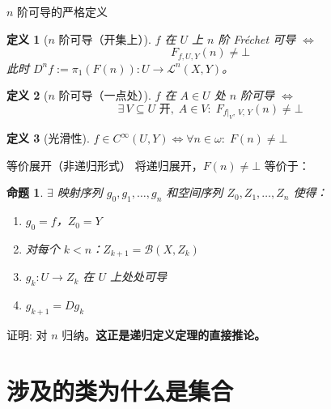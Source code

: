 \documentclass[10pt,aspectratio=169]{beamer}
\newtheorem{dfn}{定义}[section]
\newtheorem{prop}{命题}[section]
\newcommand{\calL}{\mathcal{L}}
\newcommand{\calB}{\mathcal{B}}
\begin{document}
\begin{frame}{$n$ 阶可导的严格定义}
  \begin{dfn}[$n$ 阶可导（开集上）]
    $f$ 在 $U$ 上 $n$ 阶 Fréchet 可导 $\iff$
    \[
      \boxed{F_{f,U,Y}(n) \neq \bot}
    \]
    此时 $D^n f := \pi_1(F(n)): U \to \calL^n(X, Y)$。
  \end{dfn}

  \begin{dfn}[$n$ 阶可导（一点处）]
    $f$ 在 $A \in U$ 处 $n$ 阶可导 $\iff$
    \[
      \exists\, V \subseteq U \text{ 开},\; A \in V:\; F_{f|_V,\, V,\, Y}(n) \neq \bot
    \]
  \end{dfn}

  \begin{dfn}[光滑性]
    $f \in C^\infty(U, Y) \iff \forall n \in \omega:\; F(n) \neq \bot$
  \end{dfn}
\end{frame}

\begin{frame}{等价展开（非递归形式）}
  将递归展开，$F(n) \neq \bot$ 等价于：

  \medskip
  \begin{prop}
    $\exists$ 映射序列 $g_0, g_1, \ldots, g_n$ 和空间序列 $Z_0, Z_1, \ldots, Z_n$ 使得：
    \begin{enumerate}
      \item $g_0 = f$，$Z_0 = Y$
      \item 对每个 $k < n$：$Z_{k+1} = \calB(X, Z_k)$
      \item $g_k: U \to Z_k$ 在 $U$ 上处处可导
      \item $g_{k+1} = Dg_k$
    \end{enumerate}
  \end{prop}

  \medskip
  证明: 对 $n$ 归纳。\textbf{这正是递归定义定理的直接推论。}
\end{frame}

\section{涉及的类为什么是集合}
\end{document}

